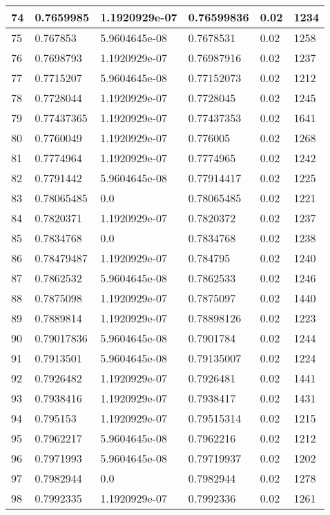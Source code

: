 \begin{longtable}{|l|l|l|l|l|l|}
74 & 0.7659985 & 1.1920929e-07 & 0.76599836 & 0.02 & 1234 \\ \hline 
75 & 0.767853 & 5.9604645e-08 & 0.7678531 & 0.02 & 1258 \\ \hline 
76 & 0.7698793 & 1.1920929e-07 & 0.76987916 & 0.02 & 1237 \\ \hline 
77 & 0.7715207 & 5.9604645e-08 & 0.77152073 & 0.02 & 1212 \\ \hline 
78 & 0.7728044 & 1.1920929e-07 & 0.7728045 & 0.02 & 1245 \\ \hline 
79 & 0.77437365 & 1.1920929e-07 & 0.77437353 & 0.02 & 1641 \\ \hline 
80 & 0.7760049 & 1.1920929e-07 & 0.776005 & 0.02 & 1268 \\ \hline 
81 & 0.7774964 & 1.1920929e-07 & 0.7774965 & 0.02 & 1242 \\ \hline 
82 & 0.7791442 & 5.9604645e-08 & 0.77914417 & 0.02 & 1225 \\ \hline 
83 & 0.78065485 & 0.0 & 0.78065485 & 0.02 & 1221 \\ \hline 
84 & 0.7820371 & 1.1920929e-07 & 0.7820372 & 0.02 & 1237 \\ \hline 
85 & 0.7834768 & 0.0 & 0.7834768 & 0.02 & 1238 \\ \hline 
86 & 0.78479487 & 1.1920929e-07 & 0.784795 & 0.02 & 1240 \\ \hline 
87 & 0.7862532 & 5.9604645e-08 & 0.7862533 & 0.02 & 1246 \\ \hline 
88 & 0.7875098 & 1.1920929e-07 & 0.7875097 & 0.02 & 1440 \\ \hline 
89 & 0.7889814 & 1.1920929e-07 & 0.78898126 & 0.02 & 1223 \\ \hline 
90 & 0.79017836 & 5.9604645e-08 & 0.7901784 & 0.02 & 1244 \\ \hline 
91 & 0.7913501 & 5.9604645e-08 & 0.79135007 & 0.02 & 1224 \\ \hline 
92 & 0.7926482 & 1.1920929e-07 & 0.7926481 & 0.02 & 1441 \\ \hline 
93 & 0.7938416 & 1.1920929e-07 & 0.7938417 & 0.02 & 1431 \\ \hline 
94 & 0.795153 & 1.1920929e-07 & 0.79515314 & 0.02 & 1215 \\ \hline 
95 & 0.7962217 & 5.9604645e-08 & 0.7962216 & 0.02 & 1212 \\ \hline 
96 & 0.7971993 & 5.9604645e-08 & 0.79719937 & 0.02 & 1202 \\ \hline 
97 & 0.7982944 & 0.0 & 0.7982944 & 0.02 & 1278 \\ \hline 
98 & 0.7992335 & 1.1920929e-07 & 0.7992336 & 0.02 & 1261 \\ \hline 

\end{longtable}
